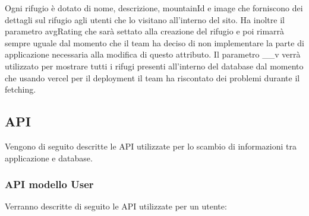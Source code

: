\documentclass[a4paper,12pt]{article}
\begin{document}
Ogni rifugio è dotato di nome, descrizione, mountainId e image che forniscono dei dettagli sul rifugio agli utenti che lo visitano all'interno del sito. \newline
Ha inoltre il parametro avgRating che sarà settato alla creazione del rifugio e poi rimarrà sempre uguale dal momento che il team ha deciso di non implementare la parte di applicazione necessaria alla modifica di questo attributo. \newline
Il parametro \_\_v verrà utilizzato per mostrare tutti i rifugi presenti all'interno del database dal momento che usando vercel per il deployment il team ha riscontato dei problemi durante il fetching.

\newpage
\subsection{API}
Vengono di seguito descritte le API utilizzate per lo scambio di informazioni tra applicazione e database.

\subsubsection{API modello User}
Verranno descritte di seguito le API utilizzate per un utente:
\end{document}
